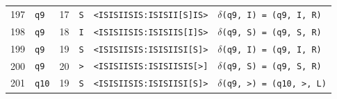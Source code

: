 \begin{table}[t]
\begin{tabularx}{\textwidth}{@{}rllllX@{}}
197 & \texttt{q9} & 17 & \texttt{S} & \texttt{<ISISIISIS:ISISII[S]IS>} & \texttt{$\delta$(q9, I) = (q9, I, R)} \\
198 & \texttt{q9} & 18 & \texttt{I} & \texttt{<ISISIISIS:ISISIIS[I]S>} & \texttt{$\delta$(q9, S) = (q9, S, R)} \\
199 & \texttt{q9} & 19 & \texttt{S} & \texttt{<ISISIISIS:ISISIISI[S]>} & \texttt{$\delta$(q9, I) = (q9, I, R)} \\
200 & \texttt{q9} & 20 & \texttt{>} & \texttt{<ISISIISIS:ISISIISIS[>]} & \texttt{$\delta$(q9, S) = (q9, S, R)} \\
201 & \texttt{q10} & 19 & \texttt{S} & \texttt{<ISISIISIS:ISISIISI[S]>} & \texttt{$\delta$(q9, >) = (q10, >, L)} \\
\bottomrule
\end{tabularx}
\end{table}
